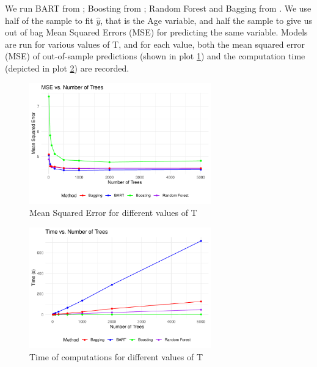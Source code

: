 \documentclass[a4paper,11pt]{article}
\begin{document}
We run BART from \cite{mccullochBARTBayesianAdditive2024}; Boosting from \cite{ridgewayGbmGeneralizedBoosted2024}; Random Forest and Bagging from \cite{breimanRandomForestBreimanCutlers2024}. We use half of the sample to fit $\hat{y}$, that is the Age variable, and half the sample to give us out of bag Mean Squared Errors (MSE) for predicting the same variable. Models are run for various values of T, and for each value, both the mean squared error (MSE) of out-of-sample predictions (shown in plot \ref{plot_mse}) and the computation time (depicted in plot \ref{plot_time}) are recorded.


\begin{figure}
  \centering
  \includegraphics[width=0.7\textwidth]{../outputs/mse_plot.pdf}
  \caption{Mean Squared Error for different values of T}
  \label{plot_mse}
\end{figure}

\begin{figure}
  \centering
  \includegraphics[width=0.7\textwidth]{../outputs/time_plot.pdf}
  \caption{Time of computations for different values of T}
  \label{plot_time}
\end{figure}



\newpage

\printbibliography
\end{document}
